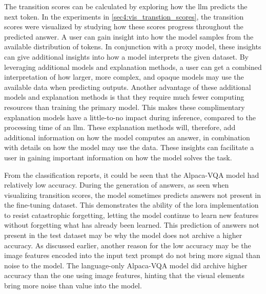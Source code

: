 The transition scores can be calculated by exploring how the \gls{llm} predicts the next token. In the experiments in \autoref{sec4:vis_transtion_scores}, the transition scores were visualized by studying how these scores progress throughout the predicted answer. A user can gain insight into how the model samples from the available distribution of tokens. In conjunction with a proxy model, these insights can give additional insights into how a model interprets the given dataset. By leveraging additional models and explanation methods, a user can get a combined interpretation of how larger, more complex, and opaque models may use the available data when predicting outputs.
Another advantage of these additional models and explanation methods is that they require much fewer computing resources than training the primary model. 
This makes these complimentary explanation models have a little-to-no impact during inference, compared to the processing time of an \gls{llm}. 
These explanation methods will, therefore, add additional information on how the model computes an answer, in combination with details on how the model may use the data. These insights can facilitate a user in gaining important information on how the model solves the task.

From the classification reports, it could be seen that the Alpaca-VQA model had relatively low accuracy. During the generation of answers, as seen when visualizing transition scores, the model sometimes predicts answers not present in the fine-tuning dataset. This demonstrates the ability of the \gls{lora} implementation to resist catastrophic forgetting, letting the model continue to learn new features without forgetting what has already been learned. 
This prediction of answers not present in the test dataset may be why the model does not archive a higher accuracy. As discussed earlier, another reason for the low accuracy may be the image features encoded into the input text prompt do not bring more signal than noise to the model. The language-only Alpaca-VQA model did archive higher accuracy than the one using image features, hinting that the visual elements bring more noise than value into the model. 


